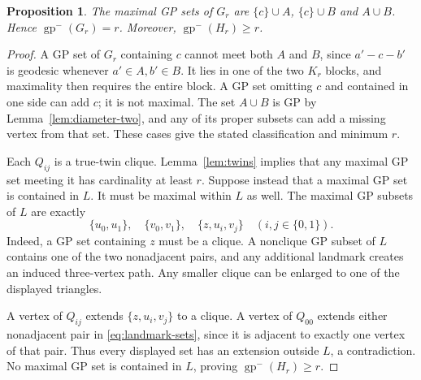 \documentclass[11pt]{article}
\newtheorem{proposition}[theorem]{Proposition}
\theoremstyle{definition}
\theoremstyle{remark}
\newcommand{\lgp}{\operatorname{gp}^{-}}
\begin{document}
\begin{proposition}\label{prop:factors}
The maximal GP sets of $G_r$ are $\{c\}\cup A$, $\{c\}\cup B$ and
$A\cup B$. Hence $\lgp(G_r)=r$. Moreover, $\lgp(H_r)\geq r$.
\end{proposition}
\begin{proof}
A GP set of $G_r$ containing $c$ cannot meet both $A$ and $B$, since
$a'-c-b'$ is geodesic whenever $a'\in A,b'\in B$. It lies in one of
the two $K_r$ blocks, and maximality then requires the entire block.
A GP set omitting $c$ and contained in one side can add $c$; it is not
maximal. The set $A\cup B$ is GP by Lemma~\ref{lem:diameter-two}, and
any of its proper subsets can add a missing vertex from that set.
These cases give the stated classification and minimum $r$.

Each $Q_{ij}$ is a true-twin clique. Lemma~\ref{lem:twins} implies that
any maximal GP set meeting it has cardinality at least $r$. Suppose
instead that a maximal GP set is contained in $L$. It must be maximal
within $L$ as well. The maximal GP subsets of $L$ are exactly
\begin{equation}\label{eq:landmark-sets}
 \{u_0,u_1\},\quad \{v_0,v_1\},\quad
 \{z,u_i,v_j\}\quad(i,j\in\{0,1\}).
\end{equation}
Indeed, a GP set containing $z$ must be a clique. A nonclique GP subset
of $L$ contains one of the two nonadjacent pairs, and any additional
landmark creates an induced three-vertex path. Any smaller clique can
be enlarged to one of the displayed triangles.

A vertex of $Q_{ij}$ extends $\{z,u_i,v_j\}$ to a clique. A vertex of
$Q_{00}$ extends either nonadjacent pair in \eqref{eq:landmark-sets},
since it is adjacent to exactly one vertex of that pair. Thus every
displayed set has an extension outside $L$, a contradiction. No
maximal GP set is contained in $L$, proving $\lgp(H_r)\geq r$.
\end{proof}
\end{document}
